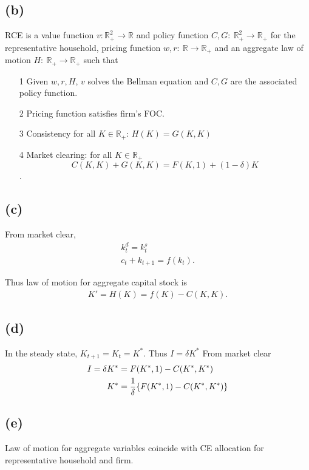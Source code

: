 \documentclass{ltjsarticle}
\begin{document}
\subsection*{(b)}
RCE is a value function $v:\mathbb{R}^2_{+}\rightarrow \mathbb{R}$ and policy function $C,G:\ \mathbb{R}^2_{+}\rightarrow \mathbb{R}_{+}$ for the representative household, pricing function $w,r:\ \mathbb{R}\rightarrow \mathbb{R}_{+}$ and an aggregate law of motion $H:\ \mathbb{R}_{+}\rightarrow \mathbb{R}_{+}$ such that
\begin{itemize}
    \item[1] Given $w,r,H$, $v$ solves the Bellman equation and $C,G$ are the associated policy function.
    \item[2] Pricing function satisfies firm's FOC.
    \item[3] Consistency for all $K\in \mathbb{R}_{+}$: $H(K) = G(K,K)$
    \item[4] Market clearing: for all $K\in \mathbb{R}_{+}$
    $$C(K,K)+G(K,K) = F(K,1) + (1-\delta)K$$.
\end{itemize}

\subsection*{(c)}
From market clear,
\begin{gather*}
    k_t^d = k_t^s\\
    c_t+k_{t+1}=f(k_t).
\end{gather*}

Thus law of motion for aggregate capital stock is 
\begin{align*}
    K' = H(K)=f(K)-C(K,K).
\end{align*}

\subsection*{(d)}
In the steady state, $K_{t+1}=K_t = K^{*}$. Thus $I=\delta K^{*}$
From market clear
\begin{align*}
    I=\delta K^{*} &= F(K^{*},1) - C(K^{*},K^{*})\\
    K^{*} &=\frac{1}{\delta} \qty{F(K^{*},1) - C(K^{*},K^{*})}
\end{align*}


\subsection*{(e)}
Law of motion for aggregate variables coincide with CE allocation for representative household and firm.
\end{document}
